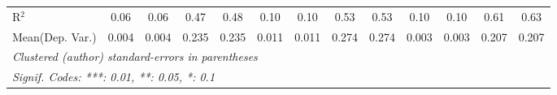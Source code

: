 \begin{tabular}{lcccccccccccc}
   R$^2$                                    & 0.06          & 0.06            & 0.47    & 0.48          & 0.10          & 0.10          & 0.53         & 0.53         & 0.10           & 0.10            & 0.61    & 0.63\\  
Mean(Dep. Var.) & 0.004 & 0.004 & 0.235 & 0.235 & 0.011 & 0.011 & 0.274 & 0.274 & 0.003 & 0.003 & 0.207 & 0.207 \\
   \midrule \midrule
   \multicolumn{13}{l}{\emph{Clustered (author) standard-errors in parentheses}}\\
   \multicolumn{13}{l}{\emph{Signif. Codes: ***: 0.01, **: 0.05, *: 0.1}}\\
\end{tabular}
\par\endgroup
